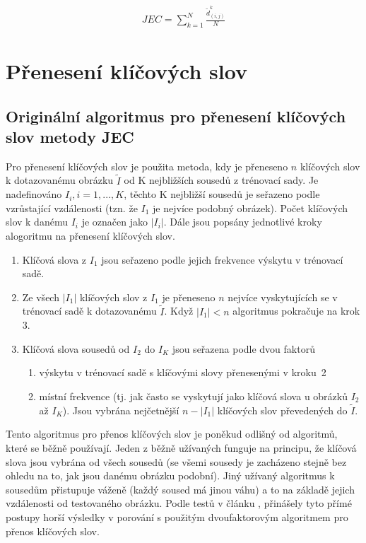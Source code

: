 \documentclass[czech,BP]{thesiskiv}
\begin{document}
\begin{align}
   \label{jec} JEC = \sum_{k=1}^N\frac{\tilde{d}_{(i,j)}^k}{N}
\end{align}

\section{Přenesení klíčových slov}
\subsection{Originální algoritmus pro přenesení klíčových slov metody JEC}
\par Pro přenesení klíčových slov je použita metoda, kdy je přeneseno $n$ klíčových slov k dotazovanému obrázku $\tilde{I}$ od K nejbližších sousedů z trénovací sady. Je nadefinováno $I_{i}, i = 1, ..., K$, těchto K nejbližší sousedů je seřazeno podle vzrůstající vzdálenosti (tzn. že $I_{1} $ je nejvíce podobný obrázek). Počet klíčových slov k danému $I_{i}$ je označen jako $|I_{i}|$. Dále jsou popsány jednotlivé kroky alogoritmu na přenesení klíčových slov.
\begin{enumerate}
	\item Klíčová slova z $I_{1}$ jsou seřazeno podle jejich frekvence výskytu v trénovací sadě.
	\item Ze všech $|I_{1}|$ klíčových slov z $I_{1}$ je přeneseno $n$ nejvíce vyskytujících se v trénovací sadě k dotazovanému $\tilde{I}$. Když $|I_{1}| < n$ algoritmus pokračuje na krok 3. 
	\item Klíčová slova sousedů od $I_{2}$ do $I_{K}$ jsou seřazena podle dvou faktorů
	\begin{enumerate}
		\item výskytu v trénovací sadě s klíčovými slovy přenesenými v kroku~2
		\item místní frekvence (tj. jak často se vyskytují jako klíčová slova u obrázků $I_{2}$ až $I_{K}$). Jsou vybrána nejčetnější $n-|I_{1}|$ klíčových slov převedených do $\tilde{I}$.
	\end{enumerate}
\end{enumerate}

\par Tento algoritmus pro přenos klíčových slov je poněkud odlišný od algoritmů, které se běžně používají. Jeden z běžně užívaných funguje na principu, že klíčová slova jsou vybrána od všech sousedů (se všemi sousedy je zacházeno stejně bez ohledu na to, jak jsou danému obrázku podobní). Jiný užívaný algoritmus k sousedům přistupuje váženě (každý soused má jinou váhu) a to na základě jejich vzdálenosti od testovaného obrázku. Podle testů v článku \citep{JEC}, přinášely tyto přímé postupy horší výsledky v porování s použitým dvoufaktorovým algoritmem pro přenos klíčových slov. \\
 
\end{document}
